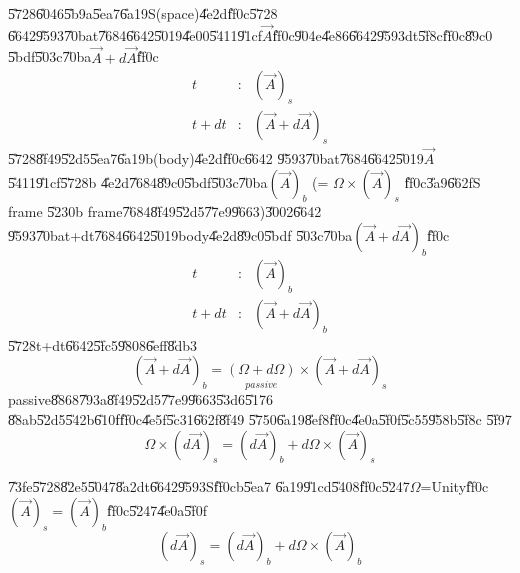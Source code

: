 \documentclass[12pt]{article}
\begin{document}
\U{5728}\U{6046}\U{5b9a}\U{5ea7}\U{6a19}S(space)\U{4e2d}\U{ff0c}\U{5728}%
\U{6642}\U{9593}\U{70ba}t\U{7684}\U{6642}\U{5019}\U{4e00}\U{5411}\U{91cf}$%
\vec{A}$\U{ff0c}\U{904e}\U{4e86}\U{6642}\U{9593}dt\U{5f8c}\U{ff0c}\U{89c0}%
\U{5bdf}\U{503c}\U{70ba}$\vec{A}+d\vec{A}$\U{ff0c}%
\begin{eqnarray}
t &:&(\vec{A})_{s} \\
t+dt &:&\left( \vec{A}+d\vec{A}\right) _{s}
\end{eqnarray}%
\U{5728}\U{8f49}\U{52d5}\U{5ea7}\U{6a19}b(body)\U{4e2d}\U{ff0c}\U{6642}%
\U{9593}\U{70ba}t\U{7684}\U{6642}\U{5019}$\vec{A}$\U{5411}\U{91cf}\U{5728}b%
\U{4e2d}\U{7684}\U{89c0}\U{5bdf}\U{503c}\U{70ba}$\left( \vec{A}\right) _{b}$%
(= $\Omega \times \left( \vec{A}\right) _{s}$ \U{ff0c}\U{3a9}\U{662f}S frame%
\U{5230}b frame\U{7684}\U{8f49}\U{52d5}\U{77e9}\U{9663})\U{3002}\U{6642}%
\U{9593}\U{70ba}t+dt\U{7684}\U{6642}\U{5019}body\U{4e2d}\U{89c0}\U{5bdf}%
\U{503c}\U{70ba}$\left( \vec{A}+d\vec{A}\right) _{b}$\U{ff0c}%
\begin{eqnarray}
t &:&\left( \vec{A}\right) _{b} \\
t+dt &:&\left( \vec{A}+d\vec{A}\right) _{b}
\end{eqnarray}%
\U{5728}t+dt\U{6642}\U{5fc5}\U{9808}\U{6eff}\U{8db3}%
\begin{equation}
\left( \vec{A}+d\vec{A}\right) _{b}=\underset{passive}{\left( \Omega
+d\Omega \right) }\times \left( \vec{A}+d\vec{A}\right) _{s}
\label{finiterotmatrix}
\end{equation}%
passive\U{8868}\U{793a}\U{8f49}\U{52d5}\U{77e9}\U{9663}\U{53d6}\U{5176}%
\U{88ab}\U{52d5}\U{542b}\U{610f}\U{ff0c}\U{4e5f}\U{5c31}\U{662f}\U{8f49}%
\U{5750}\U{6a19}\U{8ef8}\U{ff0c}\U{4e0a}\U{5f0f}\U{5c55}\U{958b}\U{5f8c}%
\U{5f97}%
\begin{equation}
\Omega \times \left( d\vec{A}\right) _{s}=\left( d\vec{A}\right)
_{b}+d\Omega \times \left( \vec{A}\right) _{s}
\end{equation}

\U{73fe}\U{5728}\U{82e5}\U{5047}\U{8a2d}t\U{6642}\U{9593}S\U{ff0c}b\U{5ea7}%
\U{6a19}\U{91cd}\U{5408}\U{ff0c}\U{5247}$\Omega $=Unity\U{ff0c}$\left( \vec{A%
}\right) _{s}=\left( \vec{A}\right) _{b}$\U{ff0c}\U{5247}\U{4e0a}\U{5f0f}%
\begin{equation}
\left( d\vec{A}\right) _{s}=\left( d\vec{A}\right) _{b}+d\Omega \times
\left( \vec{A}\right) _{b}  \label{vectorrateofchange}
\end{equation}
\end{document}
